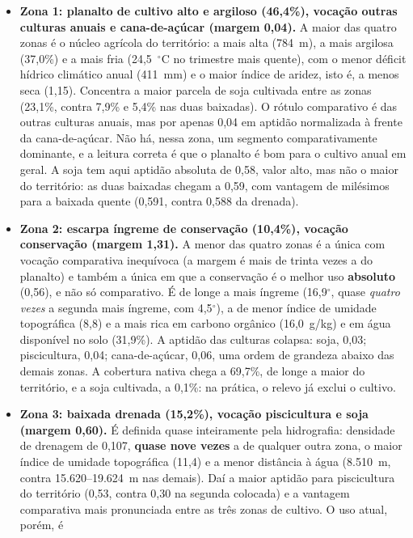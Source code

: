 \begin{itemize}
  \item \textbf{Zona 1: planalto de cultivo alto e argiloso (46,4\%), vocação outras
    culturas anuais e cana-de-açúcar (margem 0,04).} A maior das quatro zonas é o núcleo
    agrícola do território: a mais alta (784~m), a mais argilosa (37,0\%) e a mais fria
    (24,5~$^\circ$C no trimestre mais quente), com o menor déficit hídrico climático anual
    (411~mm) e o maior índice de aridez, isto é, a menos seca (1,15). Concentra a maior parcela
    de soja cultivada entre as zonas (23,1\%, contra 7,9\% e 5,4\% nas duas baixadas). O rótulo
    comparativo é das outras culturas anuais, mas por apenas 0,04 em aptidão normalizada à frente da
    cana-de-açúcar. Não há, nessa zona, um segmento comparativamente dominante, e a leitura correta é
    que o planalto é bom para o cultivo anual em geral. A soja tem aqui aptidão absoluta de 0,58,
    valor alto, mas não o maior do território: as duas baixadas chegam a 0,59, com vantagem de
    milésimos para a baixada quente (0,591, contra 0,588 da drenada).
  \item \textbf{Zona 2: escarpa íngreme de conservação (10,4\%), vocação conservação
    (margem 1,31).} A menor das quatro zonas é a única com vocação comparativa inequívoca (a
    margem é mais de trinta vezes a do planalto) e também a única em que a conservação é o
    melhor uso \textbf{absoluto} (0,56), e não só comparativo. É de longe a mais íngreme
    (16,9$^\circ$, quase \emph{quatro vezes} a segunda mais íngreme, com 4,5$^\circ$), a de menor
    índice de umidade topográfica (8,8) e a mais rica em carbono orgânico (16,0~g/kg) e em água
    disponível no solo (31,9\%). A aptidão das culturas colapsa: soja, 0,03; piscicultura,
    0,04; cana-de-açúcar, 0,06, uma ordem de grandeza abaixo das demais zonas. A cobertura nativa
    chega a 69,7\%, de longe a maior do território, e a soja cultivada, a 0,1\%: na prática, o
    relevo já exclui o cultivo.
  \item \textbf{Zona 3: baixada drenada (15,2\%), vocação piscicultura e soja (margem
    0,60).} É definida quase inteiramente pela hidrografia: densidade de drenagem de 0,107,
    \textbf{quase nove vezes} a de qualquer outra zona, o maior índice de umidade topográfica
    (11,4) e a menor distância à água (8.510~m, contra 15.620--19.624~m nas demais). Daí a maior
    aptidão para piscicultura do território (0,53, contra 0,30 na segunda colocada) e a
    vantagem comparativa mais pronunciada entre as três zonas de cultivo. O uso atual, porém, é

\end{itemize}
